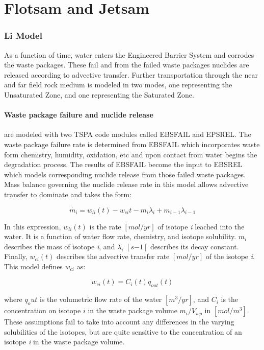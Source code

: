 \section{Flotsam and Jetsam}

\subsubsection{Li Model\cite{li_methodology_2006}} As a function of time, water
enters the Engineered Barrier System and corrodes the waste packages.  These
fail and from the failed waste packages nuclides are released according to
advective transfer.  Further transportation through the near and far field rock
medium is modeled in two modes, one representing the Unsaturated Zone, and one
representing the Saturated Zone.

\paragraph{Waste package failure and nuclide release} are modeled with two TSPA
code modules called EBSFAIL and EPSREL. The waste package failure rate is
determined from EBSFAIL which incorporates waste form chemistry, humidity,
oxidation, etc and upon contact from water begins the degradation process. The
results of EBSFAIL become the input to EBSREL which models corresponding
nuclide release from those failed waste packages. Mass balance governing the
nuclide release rate in this model allows advective transfer to dominate and
takes the form:

\begin{equation}
\dot{m_i}=w_{li}(t)-w_{ci}{t}-m_i\lambda_i+m_{i-1}\lambda_{i-1}\nonumber
\end{equation}

In this expression, $w_{li}(t)$ is the rate $[mol/yr]$ of isotope \emph{i}
leached into the water.  It is a function of water flow rate, chemistry, and
isotope solubility. $m_i$ describes the mass of isotope \emph{i}, and
$\lambda_i$ $[s{-1}]$ describes its decay constant. Finally, $w_{ci}(t)$
describes the advective transfer rate $[mol/yr]$ of the isotope \emph{i}. This 
model defines $w_{ci}$ as:

\begin{equation}
  w_{ci}(t)=C_i(t)q_{out}(t) 
\end{equation}

where $q_out$ is the volumetric flow rate of the water $[m^3/yr]$, and 
$C_i$ is the concentration on isotope $i$ in the waste package volume 
$m_i/V_{wp}$ in $[mol/m^3]$. These assumptions fail to take into account any
differences in the varying solubilities of the isotopes, but are quite
sensitive to the concentration of an isotope \emph{i} in the waste package
volume.  


